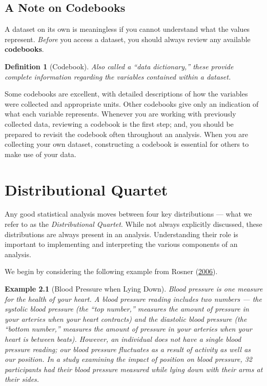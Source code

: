 \documentclass[
]{book}
\theoremstyle{plain}
\theoremstyle{mydefn}
\newtheorem{definition}{Definition}[chapter]
\theoremstyle{myexmpl}
\newtheorem{example}{Example}[chapter]
\theoremstyle{remark}
\begin{document}
\hypertarget{a-note-on-codebooks}{%
\section{A Note on Codebooks}\label{a-note-on-codebooks}}

A dataset on its own is meaningless if you cannot understand what the values represent. \emph{Before} you access a dataset, you should always review any available \textbf{codebooks}.

\begin{definition}[Codebook]
\protect\hypertarget{def:defn-codebook}{}{\label{def:defn-codebook} {} }Also called a ``data dictionary,'' these provide complete information regarding the variables contained within a dataset.
\end{definition}

Some codebooks are excellent, with detailed descriptions of how the variables were collected and appropriate units. Other codebooks give only an indication of what each variable represents. Whenever you are working with previously collected data, reviewing a codebook is the first step; and, you should be prepared to revisit the codebook often throughout an analysis. When you are collecting your own dataset, constructing a codebook is essential for others to make use of your data.

\hypertarget{distributional-quartet}{%
\chapter{Distributional Quartet}\label{distributional-quartet}}

Any good statistical analysis moves between four key distributions --- what we refer to as the \emph{Distributional Quartet}. While not always explicitly discussed, these distributions are always present in an analysis. Understanding their role is important to implementing and interpreting the various components of an analysis.

We begin by considering the following example from Rosner (\protect\hyperlink{ref-Rosner2006}{2006}).

\begin{example}[Blood Pressure when Lying Down]
\protect\hypertarget{exm:distributional-quartet-bp}{}{\label{exm:distributional-quartet-bp} {} }Blood pressure is one measure for the health of your heart. A blood pressure reading includes two numbers --- the systolic blood pressure (the ``top number,'' measures the amount of pressure in your arteries when your heart contracts) and the diastolic blood pressure (the ``bottom number,'' measures the amount of pressure in your arteries when your heart is between beats). However, an individual does not have a single blood pressure reading; our blood pressure fluctuates as a result of activity as well as our position. In a study examining the impact of position on blood pressure, 32 participants had their blood pressure measured while lying down with their arms at their sides.
\end{example}
\end{document}
